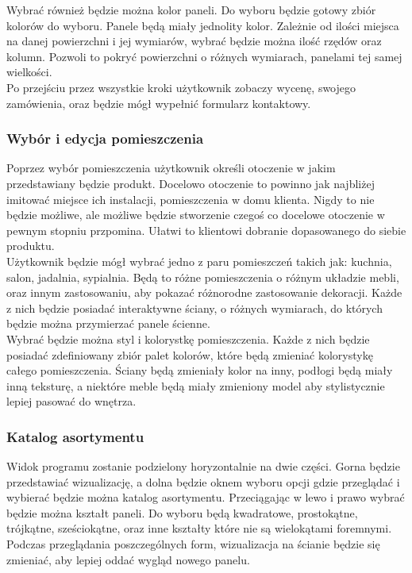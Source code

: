 \documentclass{article} %
\begin{document}
        Wybrać również będzie można kolor paneli. Do wyboru będzie gotowy zbiór kolorów do wyboru. Panele będą miały jednolity kolor. Zależnie od ilości miejsca na danej powierzchni i jej wymiarów, wybrać będzie można ilość rzędów oraz kolumn. Pozwoli to pokryć powierzchni o różnych wymiarach, panelami tej samej wielkości.
        \\
        
        Po przejściu przez wszystkie kroki użytkownik zobaczy wycenę, swojego zamówienia, oraz będzie mógł wypełnić formularz kontaktowy.
        \\
    
        \subsubsection{Wybór i edycja pomieszczenia}
        Poprzez wybór pomieszczenia użytkownik określi otoczenie w jakim przedstawiany będzie produkt. Docelowo otoczenie to powinno jak najbliżej imitować miejsce ich instalacji, pomieszczenia w domu klienta. Nigdy to nie będzie możliwe, ale możliwe będzie stworzenie czegoś co docelowe otoczenie w pewnym stopniu przpomina. Ułatwi to klientowi dobranie dopasowanego do siebie produktu.
        \\
        
        Użytkownik będzie mógł wybrać jedno z paru pomieszczeń takich jak: kuchnia, salon, jadalnia, sypialnia. Będą to różne pomieszczenia o różnym układzie mebli, oraz innym zastosowaniu, aby pokazać różnorodne zastosowanie dekoracji. Każde z nich będzie posiadać interaktywne ściany, o różnych wymiarach, do których będzie można przymierzać panele ścienne.
        \\
        
        Wybrać będzie można styl i kolorystkę pomieszczenia. Każde z nich będzie posiadać zdefiniowany zbiór palet kolorów, które będą zmieniać kolorystykę całego pomieszczenia. Ściany będą zmieniały kolor na inny, podłogi będą miały inną teksturę, a niektóre meble będą miały zmieniony model aby stylistycznie lepiej pasować do wnętrza.
        \\
        
        \subsubsection{Katalog asortymentu}
        Widok programu zostanie podzielony horyzontalnie na dwie części. Gorna będzie przedstawiać wizualizację, a dolna będzie oknem wyboru opcji gdzie przeglądać i wybierać będzie można katalog asortymentu. Przeciągając w lewo i prawo wybrać będzie można kształt paneli. Do wyboru będą kwadratowe, prostokątne, trójkątne, sześciokątne, oraz inne kształty które nie są wielokątami foremnymi. Podczas przeglądania poszczególnych form, wizualizacja na ścianie będzie się zmieniać, aby lepiej oddać wygląd nowego panelu.
        \\
        
\end{document}
